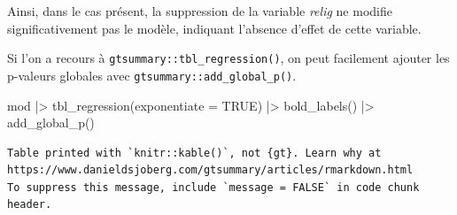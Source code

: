 \documentclass[
  letterpaper,
  DIV=11,
  numbers=noendperiod,
  oneside]{scrreprt}
\newenvironment{Shaded}{\begin{snugshade}}{\end{snugshade}}
\newcommand{\AttributeTok}[1]{\textcolor[rgb]{0.40,0.45,0.13}{#1}}
\newcommand{\ConstantTok}[1]{\textcolor[rgb]{0.56,0.35,0.01}{#1}}
\newcommand{\FunctionTok}[1]{\textcolor[rgb]{0.28,0.35,0.67}{#1}}
\newcommand{\NormalTok}[1]{\textcolor[rgb]{0.00,0.23,0.31}{#1}}
\newcommand{\SpecialCharTok}[1]{\textcolor[rgb]{0.37,0.37,0.37}{#1}}
\begin{document}
Ainsi, dans le cas présent, la suppression de la variable \emph{relig}
ne modifie significativement pas le modèle, indiquant l'absence d'effet
de cette variable.

Si l'on a recours à \texttt{gtsummary::tbl\_regression()}, on peut
facilement ajouter les p-valeurs globales avec
\texttt{gtsummary::add\_global\_p()}.

\begin{Shaded}
\begin{Highlighting}[]
\NormalTok{mod }\SpecialCharTok{|\textgreater{}}
  \FunctionTok{tbl\_regression}\NormalTok{(}\AttributeTok{exponentiate =} \ConstantTok{TRUE}\NormalTok{) }\SpecialCharTok{|\textgreater{}}
  \FunctionTok{bold\_labels}\NormalTok{() }\SpecialCharTok{|\textgreater{}} 
  \FunctionTok{add\_global\_p}\NormalTok{()}
\end{Highlighting}
\end{Shaded}

\begin{verbatim}
Table printed with `knitr::kable()`, not {gt}. Learn why at
https://www.danieldsjoberg.com/gtsummary/articles/rmarkdown.html
To suppress this message, include `message = FALSE` in code chunk header.
\end{verbatim}
\end{document}
